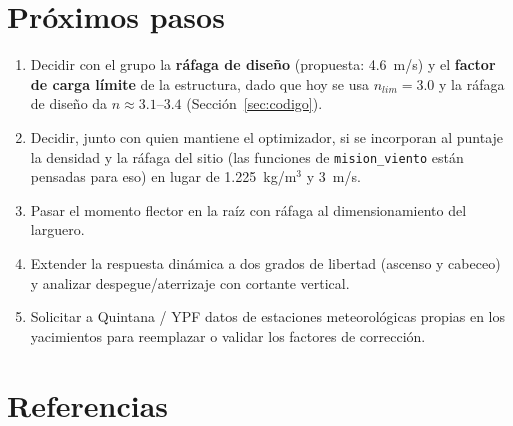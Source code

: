 \documentclass[11pt]{article}
\begin{document}
\section{Próximos pasos}
\label{sec:proximos}

\begin{enumerate}
  \item Decidir con el grupo la \textbf{ráfaga de diseño} (propuesta:
  4.6~m/s) y el \textbf{factor de carga límite} de la estructura, dado que
  hoy se usa $n_{lim}=3.0$ y la ráfaga de diseño da $n\approx3.1$--$3.4$
  (Sección~\ref{sec:codigo}).
  \item Decidir, junto con quien mantiene el optimizador, si se incorporan
  al puntaje la densidad y la ráfaga del sitio (las funciones de
  \texttt{mision\_viento} están pensadas para eso) en lugar de 1.225~kg/m$^3$
  y 3~m/s.
  \item Pasar el momento flector en la raíz con ráfaga al dimensionamiento
  del larguero.
  \item Extender la respuesta dinámica a dos grados de libertad (ascenso y
  cabeceo) y analizar despegue/aterrizaje con cortante vertical.
  \item Solicitar a Quintana / YPF datos de estaciones meteorológicas propias
  en los yacimientos para reemplazar o validar los factores de corrección.
\end{enumerate}

\section*{Referencias}
\end{document}
